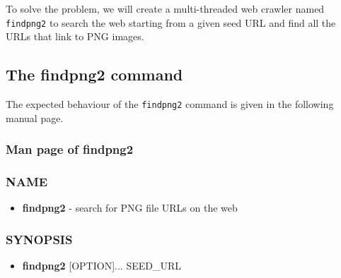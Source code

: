 To solve the problem, we will create a multi-threaded web crawler named \verb+findpng2+ to search the web starting from a given seed URL and find all the URLs that link to PNG images.

\subsection{The findpng2 command}
The expected behaviour of the \verb+findpng2+ command is given in the following manual page.
\subsubsection{Man page of findpng2}
\label{sec:findpng2_man}
\subsubsection*{NAME}
\begin{itemize}
	\item[]{\bf findpng2} - search for PNG file URLs on the web
\end{itemize}
\subsubsection*{SYNOPSIS}
\begin{itemize}
	\item[]{\bf findpng2} [OPTION]... SEED\_URL
\end{itemize}
